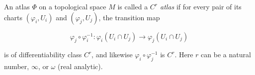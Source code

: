 An atlas $\Phi$ on a topological space $M$ is called a \textit{$C^r$ atlas} if for every pair of its charts $(\varphi_i, U_i)$ and $(\varphi_j, U_j)$, the transition map

$$\varphi_j \circ \varphi_i^{-1}: \varphi_i(U_i \cap U_j) \to \varphi_j(U_i \cap U_j)$$

is of differentiability class $C^r$, and likewise $\varphi_i \circ \varphi_j^{-1}$ is $C^r$. Here $r$ can be a natural number, $\infty$, or $\omega$ (real analytic).
